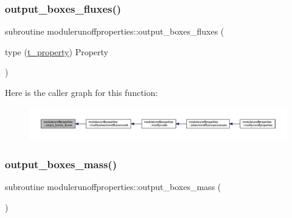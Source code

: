 \subsubsection{\texorpdfstring{output\+\_\+boxes\+\_\+fluxes()}{output\_boxes\_fluxes()}}
{\footnotesize\ttfamily subroutine modulerunoffproperties\+::output\+\_\+boxes\+\_\+fluxes (\begin{DoxyParamCaption}\item[{type (\mbox{\hyperlink{structmodulerunoffproperties_1_1t__property}{t\+\_\+property}})}]{Property }\end{DoxyParamCaption})\hspace{0.3cm}{\ttfamily [private]}}

Here is the caller graph for this function\+:\nopagebreak
\begin{figure}[H]
\begin{center}
\leavevmode
\includegraphics[width=350pt]{namespacemodulerunoffproperties_ab76e643833d72d16c6b9e934a268c931_icgraph}
\end{center}
\end{figure}
\mbox{\label{namespacemodulerunoffproperties_ad59aaacda5f23a659f2d8cf4d4c29dfa}} 
\subsubsection{\texorpdfstring{output\+\_\+boxes\+\_\+mass()}{output\_boxes\_mass()}}
{\footnotesize\ttfamily subroutine modulerunoffproperties\+::output\+\_\+boxes\+\_\+mass (\begin{DoxyParamCaption}{ }\end{DoxyParamCaption})\hspace{0.3cm}{\ttfamily [private]}}

